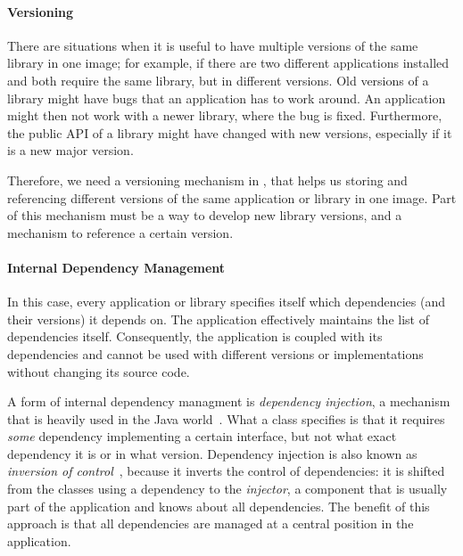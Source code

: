 \paragraph{Versioning}
There are situations when it is useful to have multiple versions of the same library in one image; for example, if there are two different applications installed and both require the same library, but in different versions. Old versions of a library might have bugs that an application has to work around. An application might then not work with a newer library, where the bug is fixed. Furthermore, the public API of a library might have changed with new versions, especially if it is a new major version.

Therefore, we need a versioning mechanism in \msname, that helps us storing and referencing different versions of the same application or library in one image. Part of this mechanism must be a way to develop new library versions, and a mechanism to reference a certain version.

\paragraph{Internal Dependency Management}
In this case, every application or library specifies itself which dependencies (and their versions) it depends on. The application effectively maintains the list of dependencies itself. Consequently, the application is coupled with its dependencies and cannot be used with different versions or implementations without changing its source code.

A form of internal dependency managment is \emph{dependency injection}, a mechanism that is heavily used in the Java world~\cite{Prasanna:2009:DI:1795686}. What a class specifies is that it requires \emph{some} dependency implementing a certain interface, but not what exact dependency it is or in what version. Dependency injection is also known as \emph{inversion of control}~\cite{fowlerioc}, because it inverts the control of dependencies: it is shifted from the classes using a dependency to the \emph{injector}, a component that is usually part of the application and knows about all dependencies. The benefit of this approach is that all dependencies are managed at a central position in the application.


